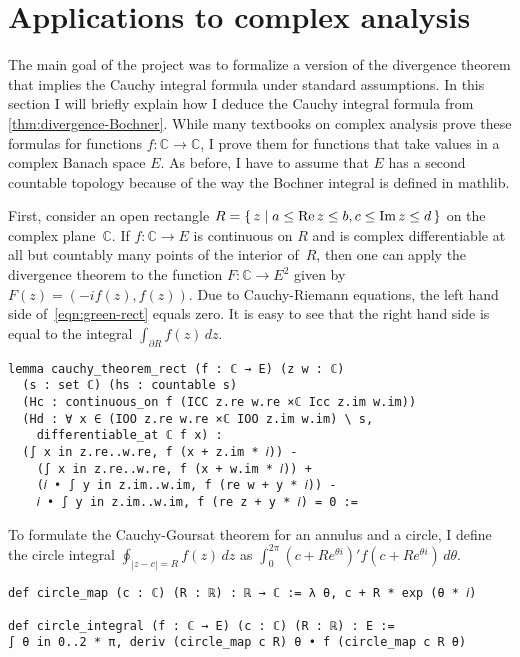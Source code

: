 \documentclass[a4paper,UKenglish,cleveref, autoref, thm-restate]{lipics-v2021}
\newcommand{\bbC}{\mathbb{C}}
\begin{document}
\section{Applications to complex analysis}%
\label{sec:appl-compl-analys}

The main goal of the project was to formalize a version of the
divergence theorem that implies the Cauchy integral formula under
standard assumptions. In this section I will briefly explain how I
deduce the Cauchy integral formula from
\autoref{thm:divergence-Bochner}. While many textbooks on complex
analysis prove these formulas for functions \(f\colon \bbC\to \bbC\), I
prove them for functions that take values in a complex Banach space
\(E\). As before, I have to assume that \(E\) has a second countable
topology because of the way the Bochner integral is defined in
mathlib.

First, consider an open rectangle
\(R=\set{z|a\le \operatorname{Re}z\le b,c\le \operatorname{Im}z\le d}\) on the complex
plane~\(\bbC\). If \(f\colon \bbC\to E\) is continuous on \(R\) and is
complex differentiable at all but countably many points of the
interior of~\(R\), then one can apply the divergence theorem to the
function \(F\colon \bbC \to E^{2}\) given by \(F(z)=(-if(z),
f(z))\). Due to Cauchy-Riemann equations, the left hand side
of~\eqref{eqn:green-rect} equals zero. It is easy to see that the
right hand side is equal to the integral
\(\int_{\partial R}f(z)\,dz\).

\begin{lstlisting}[caption={The Cauchy-Goursat theorem for a rectangle},label=lst:cauchy-rect]
lemma cauchy_theorem_rect (f : ℂ → E) (z w : ℂ)
  (s : set ℂ) (hs : countable s)
  (Hc : continuous_on f (ICC z.re w.re ×ℂ Icc z.im w.im))
  (Hd : ∀ x ∈ (IOO z.re w.re ×ℂ IOO z.im w.im) \ s,
    differentiable_at ℂ f x) :
  (∫ x in z.re..w.re, f (x + z.im * 𝑖)) -
    (∫ x in z.re..w.re, f (x + w.im * 𝑖)) +
    (𝑖 • ∫ y in z.im..w.im, f (re w + y * 𝑖)) -
    𝑖 • ∫ y in z.im..w.im, f (re z + y * 𝑖) = 0 :=
\end{lstlisting}

To formulate the Cauchy-Goursat theorem for an annulus and a circle, I
define the circle integral \(\oint_{|z-c|=R}f(z)\,dz\) as
\(\int_{0}^{2\pi}(c+Re^{\theta i})'f(c+Re^{\theta i})\,d\theta\).

\begin{lstlisting}[caption=Definition of the circle integral \(\oint_{|z-c|=R}f(z)\,dz\)]
def circle_map (c : ℂ) (R : ℝ) : ℝ → ℂ := λ θ, c + R * exp (θ * 𝑖)

def circle_integral (f : ℂ → E) (c : ℂ) (R : ℝ) : E :=
∫ θ in 0..2 * π, deriv (circle_map c R) θ • f (circle_map c R θ)
\end{lstlisting}
\end{document}
